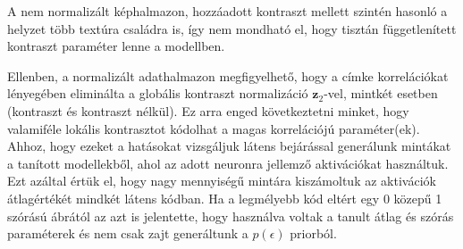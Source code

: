 \documentclass[12pt, english]{article}
\begin{document}
\par A nem normalizált képhalmazon, hozzáadott kontraszt mellett szintén hasonló a helyzet több textúra családra is, így nem mondható el, hogy tisztán függetlenített kontraszt paraméter lenne a modellben.

\vspace{4mm}

\par Ellenben, a normalizált adathalmazon megfigyelhető, hogy a címke korrelációkat lényegében eliminálta a globális kontraszt normalizáció $\bm{z}_{2}$-vel, mintkét esetben (kontraszt és kontraszt nélkül). Ez arra enged következtetni minket, hogy valamiféle lokális kontrasztot kódolhat a magas korrelációjú paraméter(ek). Ahhoz, hogy ezeket a hatásokat vizsgáljuk látens bejárással generálunk mintákat a tanított modellekből, ahol az adott neuronra jellemző aktivációkat használtuk. Ezt azáltal értük el, hogy nagy mennyiségű mintára kiszámoltuk az aktivációk átlagértékét mindkét látens kódban. Ha a legmélyebb kód eltért egy 0 közepű 1 szórású ábrától az azt is jelentette, hogy használva voltak a tanult átlag és szórás paraméterek és nem csak zajt generáltunk a $p(\epsilon)$ priorból. 

\vspace{4mm}
\end{document}
